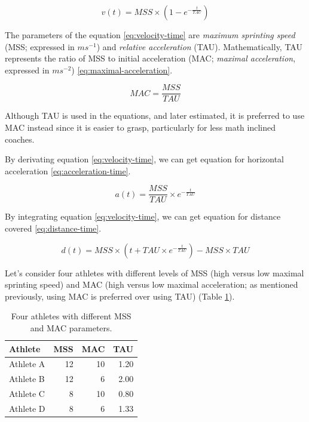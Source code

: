 \documentclass[fleqn,10pt,lineno]{wlpeerj} %
\begin{document}
\begin{equation}
  v(t) = MSS \times (1 - e^{-\frac{t}{TAU}}) \label{eq:velocity-time}
\end{equation}

The parameters of the equation \eqref{eq:velocity-time} are \emph{maximum sprinting speed} (MSS; expressed in \(ms^{-1}\)) and \emph{relative acceleration} (TAU). Mathematically, TAU represents the ratio of MSS to initial acceleration (MAC; \emph{maximal acceleration}, expressed in \(ms^{-2}\)) \eqref{eq:maximal-acceleration}.

\begin{equation}
  MAC = \frac{MSS}{TAU}\label{eq:maximal-acceleration}
\end{equation}

Although TAU is used in the equations, and later estimated, it is preferred to use MAC instead since it is easier to grasp, particularly for less math inclined coaches.

By derivating equation \eqref{eq:velocity-time}, we can get equation for horizontal acceleration \eqref{eq:acceleration-time}.

\begin{equation}
  a(t) = \frac{MSS}{TAU} \times e^{-\frac{t}{TAU}}  \label{eq:acceleration-time}
\end{equation}

By integrating equation \eqref{eq:velocity-time}, we can get equation for distance covered \eqref{eq:distance-time}.

\begin{equation}
  d(t) = MSS \times (t + TAU \times e^{-\frac{t}{TAU}}) - MSS \times TAU  \label{eq:distance-time}
\end{equation}

Let's consider four athletes with different levels of MSS (high versus low maximal sprinting speed) and MAC (high versus low maximal acceleration; as mentioned previously, using MAC is preferred over using TAU) (Table \ref{tab:four-athletes-table}).

\begin{table}

\caption{\label{tab:four-athletes-table}Four athletes with different MSS and MAC parameters.}
\centering
\begin{tabular}[t]{lrrr}
\toprule
Athlete & MSS & MAC & TAU\\
\midrule
Athlete A & 12 & 10 & 1.20\\
Athlete B & 12 & 6 & 2.00\\
Athlete C & 8 & 10 & 0.80\\
Athlete D & 8 & 6 & 1.33\\
\bottomrule
\end{tabular}
\end{table}
\end{document}

